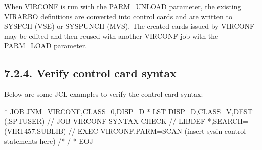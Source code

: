 \documentclass[letterpaper,10pt,english]{sphinxmanual}
\begin{document}

When VIRCONF is run with the PARM=UNLOAD parameter, the existing VIRARBO definitions are converted into control cards and are written to SYSPCH (VSE) or SYSPUNCH (MVS). The created cards issued by VIRCONF may be edited and then reused with another VIRCONF job with the PARM=LOAD parameter.


\subsection{7.2.4. Verify control card syntax}
\label{\detokenize{Installation_Guide:verify-control-card-syntax}}
Below are some JCL examples to verify the control card syntax:-

\begin{sphinxVerbatim}[commandchars=\\\{\}]
* \PYGZdl{}\PYGZdl{} JOB JNM=VIRCONF,CLASS=0,DISP=D
* \PYGZdl{}\PYGZdl{} LST DISP=D,CLASS=V,DEST=(,SPTUSER)
// JOB VIRCONF SYNTAX CHECK
// LIBDEF *,SEARCH=(VIRT457.SUBLIB)
// EXEC VIRCONF,PARM=\PYGZsq{}SCAN\PYGZsq{}
        (insert sysin control statements here)
/*
/\PYGZam{}
* \PYGZdl{}\PYGZdl{} EOJ
\end{sphinxVerbatim}


\begin{sphinxVerbatim}[commandchars=\\\{\}]
  
   
  
  
  
  
            
\end{sphinxVerbatim}
\end{document}
